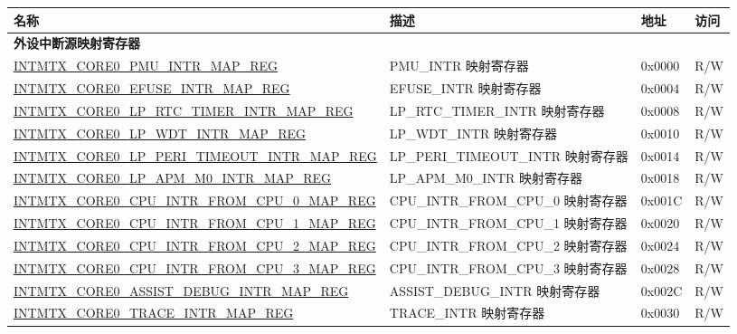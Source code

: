 \begin{longtable}{ | p{10cm} | m{10cm} | m{1.3cm} | m{1.0cm} | }
\hline\rowcolor{lightgray}
\textbf{名称} & \textbf{描述} & \textbf{地址} & \textbf{访问} \\ \hline
\endhead
\multicolumn{4}{|l|}{\textbf{外设中断源映射寄存器}} \\ \hline
\hyperref[regdesc:INTMTXCORE0PMUINTRMAPREG]{INTMTX\_CORE0\_PMU\_INTR\_MAP\_REG} & PMU\_INTR 映射寄存器 & 0x0000 & R/W \\ \hline
\hyperref[regdesc:INTMTXCORE0EFUSEINTRMAPREG]{INTMTX\_CORE0\_EFUSE\_INTR\_MAP\_REG} & EFUSE\_INTR 映射寄存器 & 0x0004 & R/W \\ \hline
\hyperref[regdesc:INTMTXCORE0LPRTCTIMERINTRMAPREG]{INTMTX\_CORE0\_LP\_RTC\_TIMER\_INTR\_MAP\_REG} & LP\_RTC\_TIMER\_INTR 映射寄存器 & 0x0008 & R/W \\ \hline
\hyperref[regdesc:INTMTXCORE0LPWDTINTRMAPREG]{INTMTX\_CORE0\_LP\_WDT\_INTR\_MAP\_REG} & LP\_WDT\_INTR 映射寄存器 & 0x0010 & R/W \\ \hline
\hyperref[regdesc:INTMTXCORE0LPPERITIMEOUTINTRMAPREG]{INTMTX\_CORE0\_LP\_PERI\_TIMEOUT\_INTR\_MAP\_REG} & LP\_PERI\_TIMEOUT\_INTR 映射寄存器 & 0x0014 & R/W \\ \hline
\hyperref[regdesc:INTMTXCORE0LPAPMM0INTRMAPREG]{INTMTX\_CORE0\_LP\_APM\_M0\_INTR\_MAP\_REG} & LP\_APM\_M0\_INTR 映射寄存器 & 0x0018 & R/W \\ \hline
\hyperref[regdesc:INTMTXCORE0CPUINTRFROMCPU0MAPREG]{INTMTX\_CORE0\_CPU\_INTR\_FROM\_CPU\_0\_MAP\_REG} & CPU\_INTR\_FROM\_CPU\_0 映射寄存器 & 0x001C & R/W \\ \hline
\hyperref[regdesc:INTMTXCORE0CPUINTRFROMCPU1MAPREG]{INTMTX\_CORE0\_CPU\_INTR\_FROM\_CPU\_1\_MAP\_REG} & CPU\_INTR\_FROM\_CPU\_1 映射寄存器 & 0x0020 & R/W \\ \hline
\hyperref[regdesc:INTMTXCORE0CPUINTRFROMCPU2MAPREG]{INTMTX\_CORE0\_CPU\_INTR\_FROM\_CPU\_2\_MAP\_REG} & CPU\_INTR\_FROM\_CPU\_2 映射寄存器 & 0x0024 & R/W \\ \hline
\hyperref[regdesc:INTMTXCORE0CPUINTRFROMCPU3MAPREG]{INTMTX\_CORE0\_CPU\_INTR\_FROM\_CPU\_3\_MAP\_REG} & CPU\_INTR\_FROM\_CPU\_3 映射寄存器 & 0x0028 & R/W \\ \hline
\hyperref[regdesc:INTMTXCORE0ASSISTDEBUGINTRMAPREG]{INTMTX\_CORE0\_ASSIST\_DEBUG\_INTR\_MAP\_REG} & ASSIST\_DEBUG\_INTR 映射寄存器 & 0x002C & R/W \\ \hline
\hyperref[regdesc:INTMTXCORE0TRACEINTRMAPREG]{INTMTX\_CORE0\_TRACE\_INTR\_MAP\_REG} & TRACE\_INTR 映射寄存器 & 0x0030 & R/W \\ \hline

\end{longtable}
